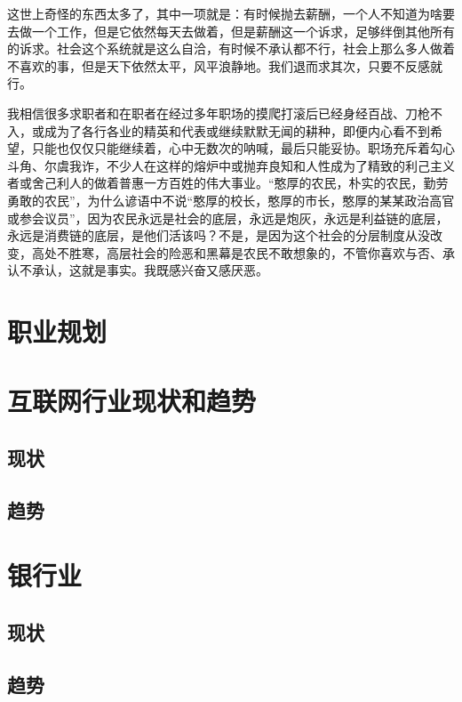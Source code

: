 \documentclass[utf8]{book}
\begin{document}
	这世上奇怪的东西太多了，其中一项就是：有时候抛去薪酬，一个人不知道为啥要去做一个工作，但是它依然每天去做着，但是薪酬这一个诉求，足够绊倒其他所有的诉求。社会这个系统就是这么自洽，有时候不承认都不行，社会上那么多人做着不喜欢的事，但是天下依然太平，风平浪静地。我们退而求其次，只要不反感就行。
	
	我相信很多求职者和在职者在经过多年职场的摸爬打滚后已经身经百战、刀枪不入，或成为了各行各业的精英和代表或继续默默无闻的耕种，即便内心看不到希望，只能也仅仅只能继续着，心中无数次的呐喊，最后只能妥协。职场充斥着勾心斗角、尔虞我诈，不少人在这样的熔炉中或抛弃良知和人性成为了精致的利己主义者或舍己利人的做着普惠一方百姓的伟大事业。“憨厚的农民，朴实的农民，勤劳勇敢的农民”，为什么谚语中不说“憨厚的校长，憨厚的市长，憨厚的某某政治高官或参会议员”，因为农民永远是社会的底层，永远是炮灰，永远是利益链的底层，永远是消费链的底层，是他们活该吗？不是，是因为这个社会的分层制度从没改变，高处不胜寒，高层社会的险恶和黑幕是农民不敢想象的，不管你喜欢与否、承认不承认，这就是事实。我既感兴奋又感厌恶。


\section{职业规划}

\section{互联网行业现状和趋势}

\subsection{现状}

\subsection{趋势}

\section{银行业}

\subsection{现状}

\subsection{趋势}
\end{document}
